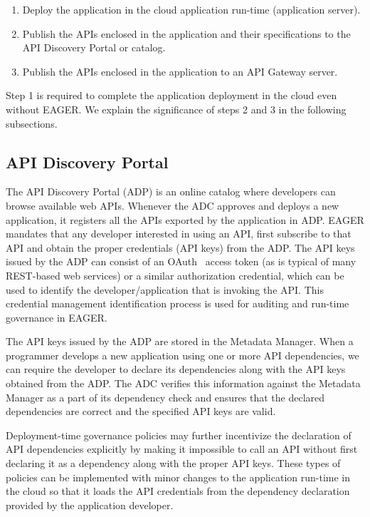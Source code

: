 \begin{enumerate}
\vspace{0.05in}
\item Deploy the application in the cloud application run-time (application server).
\vspace{0.05in}
\item Publish the APIs enclosed in the application and their specifications to
the API Discovery Portal or catalog.
\vspace{0.05in}
\item Publish the APIs enclosed in the application to an API Gateway server.
\vspace{0.05in}
\end{enumerate}

Step 1 is required to complete the application deployment in the cloud even
without EAGER. We explain the significance of steps 2 and 3 in the 
following subsections.

\subsection{API Discovery Portal} 
The API Discovery Portal (ADP) is an online
catalog where developers can browse available web APIs. Whenever the ADC
approves and deploys a new application, it registers all the APIs exported by
the application in ADP.  EAGER mandates that any developer interested in using
an API, first subscribe to that API and obtain the proper credentials (API
keys) from the ADP. The API keys issued by the ADP can consist of an
OAuth~\cite{oauth2} access
token (as is typical of many REST-based web services) 
or a similar authorization credential, which can be used to identify the
developer/application that is invoking the API. This credential management
identification process is used for auditing and run-time governance in EAGER.

The API keys issued by the ADP are stored in the Metadata Manager. When a
programmer develops a new application using one or more API dependencies, we
can require the developer to declare its dependencies along with the API
keys obtained from the ADP. The ADC verifies this information against
the Metadata Manager as a part of its dependency check and ensures that the
declared dependencies are correct and the specified API keys are valid. 

Deployment-time governance policies
may further incentivize the declaration of API 
dependencies explicitly by making it 
impossible to call an API without first declaring it as a dependency along
with the proper API keys. These types of policies can be implemented
with minor changes to the
application run-time in the cloud so that it loads the API credentials from
the dependency declaration provided by the application developer.

